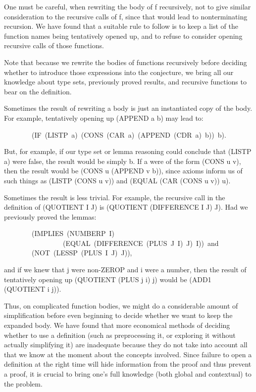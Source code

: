 \documentclass[11pt]{book}
\newenvironment{pubasis}{\begin{flushleft}\ttfamily\small}{\normalsize\rmfamily\end{flushleft}}
\begin{document}
One must be careful, when rewriting the body of f recursively,
not to give similar consideration to the recursive
calls of f, since that would lead to nonterminating recursion.
We have found that a suitable rule to
follow is to keep a list  of the function names
being tentatively opened up, and to refuse to consider
opening recursive calls of those functions.

Note that  because we rewrite the bodies of functions recursively before
deciding whether to introduce those expressions into the conjecture, we bring
all our knowledge about type sets, previously
proved results, and recursive functions to bear on the definition.

Sometimes the result of rewriting a body is just an
instantiated copy of the body.  For example, tentatively opening up
(APPEND a b)
may lead to:
\begin{pubasis}
~~~~~~~~(IF~(LISTP~a)~(CONS~(CAR~a)~(APPEND~(CDR~a)~b))~b).\\
\end{pubasis}
But, for example, if our type set or lemma reasoning could conclude that
(LISTP a) were false, the result would be simply b.  If a were of
the form (CONS u v), then the result would be (CONS u (APPEND v b)),
since axioms inform us of such things as (LISTP (CONS u v)) and
(EQUAL (CAR (CONS u v)) u).

Sometimes the result is less trivial.  For example, the
recursive call in the definition of (QUOTIENT I J) is (QUOTIENT (DIFFERENCE I J) J).  Had we previously proved the lemmas:
\begin{pubasis}
~~~~~~~~(IMPLIES~(NUMBERP~I)\\
~~~~~~~~~~~~~~~~~(EQUAL~(DIFFERENCE~(PLUS~J~I)~J)~I))~and\\

~~~~~~~~(NOT~(LESSP~(PLUS~I~J)~J)),\\
\end{pubasis}
and if we knew that j were non-ZEROP and i were a number,
then the result of tentatively opening up (QUOTIENT (PLUS j i) j)
would be (ADD1 (QUOTIENT i j)).

Thus, on complicated function bodies, we might do a considerable amount of
simplification before even beginning to decide whether we want to
keep the expanded body.
We have found that more economical methods of deciding whether to
use a definition (such as preprocessing it, or exploring it without
actually simplifying it) are  inadequate
because they do not take into account all that we know at the moment
about the concepts involved.  Since failure to open a definition at
the right time will hide information from the proof and thus prevent a
proof, it is crucial to bring one's full knowledge
(both global and contextual) to the problem.
\end{document}
